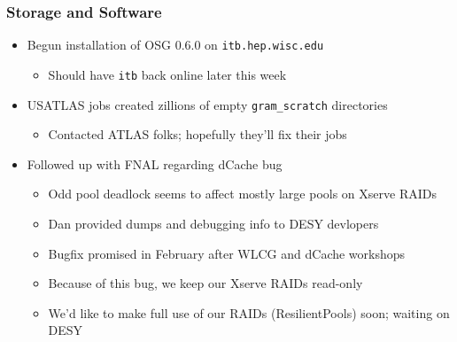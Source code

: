 \documentclass{beamer}
\begin{document}
\begin{frame}
    \frametitle{Storage and Software}
    \begin{itemize}
        \item Begun installation of OSG 0.6.0 on {\tt itb.hep.wisc.edu}
        \begin{itemize}
            \item Should have {\tt itb} back online later this week
        \end{itemize}
        \item USATLAS jobs created zillions of empty {\tt gram\_scratch} directories
        \begin{itemize}
            \item Contacted ATLAS folks; hopefully they'll fix their jobs
        \end{itemize}
        \item Followed up with FNAL regarding dCache bug
        \begin{itemize}
            \item Odd pool deadlock seems to affect mostly large pools on Xserve RAIDs
            \item Dan provided dumps and debugging info to DESY devlopers
            \item Bugfix promised in February after WLCG and dCache workshops
            \item Because of this bug, we keep our Xserve RAIDs read-only
            \item We'd like to make full use of our RAIDs (ResilientPools) soon; waiting on DESY
        \end{itemize}
    \end{itemize}
\end{frame}
\end{document}
